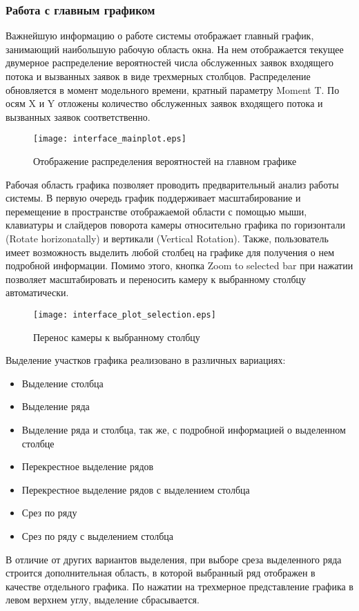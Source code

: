 \subsubsection{Работа с главным графиком}
Важнейшую информацию о работе системы отображает главный график, занимающий наибольшую рабочую область окна. На нем отображается текущее двумерное распределение вероятностей числа обслуженных заявок входящего потока и вызванных заявок в виде трехмерных столбцов. Распределение обновляется в момент модельного времени, кратный параметру Moment T. По осям X и Y отложены количество обслуженных заявок входящего потока и вызванных заявок соответственно.
\begin{figure}[H]
	\centering
	\texttt{[image: interface\_mainplot.eps]}
	\caption{Отображение распределения вероятностей на главном графике}
	\label{interface_mainplot}
\end{figure}
Рабочая область графика позволяет проводить предварительный анализ работы системы. В первую очередь график поддерживает масштабирование и перемещение в пространстве отображаемой области с помощью мыши, клавиатуры и слайдеров поворота камеры относительно графика по горизонтали (Rotate horizonatally) и вертикали (Vertical Rotation).  Также, пользователь имеет возможность выделить любой столбец на графике для получения о нем подробной информации. Помимо этого, кнопка Zoom to selected bar при нажатии позволяет масштабировать и переносить камеру к выбранному столбцу автоматически.
\begin{figure}[H]
	\centering
	\texttt{[image: interface\_plot\_selection.eps]}
	\caption{Перенос камеры к выбранному столбцу}
	\label{interface_plot_selection}
\end{figure}
Выделение участков графика реализовано в различных вариациях:
\begin{itemize}
	\item Выделение столбца
	\item Выделение ряда
	\item Выделение ряда и столбца, так же, с подробной информацией о выделенном столбце
	\item Перекрестное выделение рядов
	\item Перекрестное выделение рядов с выделением столбца
	\item Срез по ряду
	\item Срез по ряду с выделением столбца
\end{itemize}
В отличие от других вариантов выделения, при выборе среза выделенного ряда строится дополнительная область, в которой выбранный ряд отображен в качестве отдельного графика. По нажатии на трехмерное представление графика в левом верхнем углу, выделение сбрасывается.
